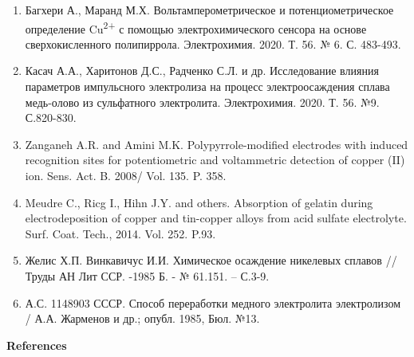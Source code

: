\begin{enumerate}
\item
Багхери А., Маранд М.Х. Вольтамперометрическое и потенциометрическое
определение Cu\textsuperscript{2+} с помощью электрохимического сенсора
на основе сверхокисленного полипиррола. Электрохимия. 2020. Т. 56. № 6.
С. 483-493.

\item
Касач А.А., Харитонов Д.С., Радченко С.Л. и др. Исследование влияния
параметров импульсного электролиза на процесс электроосаждения сплава
медь-олово из сульфатного электролита. Электрохимия. 2020. Т. 56. №9.
С.820-830.

\item
Zanganeh A.R. and Amini M.K. Polypyrrole-modified electrodes with
induced recognition sites for potentiometric and voltammetric detection
of copper (II) ion. Sens. Act. B. 2008/ Vol. 135. P. 358.

\item
Meudre C., Ricg I., Hihn J.Y. and others. Absorption of gelatin
during electrodeposition of copper and tin-copper alloys from acid
sulfate electrolyte. Surf. Coat. Tech., 2014. Vol. 252. P.93.

\item
Желис Х.П. Винкавичус И.И. Химическое осаждение никелевых сплавов //
Труды АН Лит ССР. -1985 Б. - № 61.151. -- С.3-9.

\item
А.С. 1148903 СССР. Способ переработки медного электролита
электролизом / А.А. Жарменов и др.; опубл. 1985, Бюл. №13.
\end{enumerate}

\begin{center}
{\bfseries References}
\end{center}

